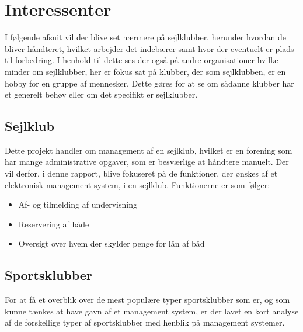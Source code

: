 \chapter{Interessenter}
\cbstart

I følgende afsnit vil der blive set nærmere på sejlklubber, herunder hvordan de bliver håndteret, hvilket arbejder det indebærer samt hvor der eventuelt er plads til forbedring. I henhold til dette ses der også på andre organisationer hvilke minder om sejlklubber, her er fokus sat på klubber, der som sejlklubben, er en hobby for en gruppe af mennesker. Dette gøres for at se om sådanne klubber har et generelt behøv eller om det specifikt er sejlklubber.

\section{Sejlklub}\label{sec:sejlklub}
Dette projekt handler om management af en sejlklub, hvilket er en forening som har mange administrative opgaver, som er
besværlige at håndtere manuelt. Der vil derfor, i denne rapport, blive fokuseret på de funktioner, der ønskes af et
elektronisk management system, i en sejlklub. Funktionerne er som følger:

\begin{itemize}
\item Af- og tilmelding af undervisning
\item Reservering af både
\item Oversigt over hvem der skylder penge for lån af båd
\end{itemize}

\section{Sportsklubber}
For at få et overblik over de mest populære typer sportsklubber som er, og som kunne tænkes at have gavn af et management system, er der lavet en kort analyse af de forskellige typer af sportsklubber med henblik på management systemer. 


